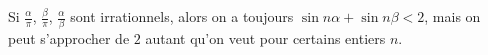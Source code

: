 Si $\frac{\alpha}{\pi}$, $\frac{\beta}{\pi}$, $\frac{\alpha}{\beta}$ sont irrationnels, alors on a toujours $\sin n\alpha + \sin n\beta < 2$, mais on peut s'approcher de $2$ autant qu'on veut pour certains entiers $n$.
